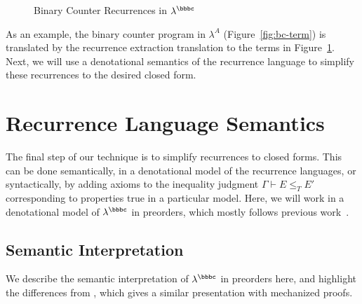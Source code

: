 \begin{figure}
  
  \vspace{-0.25in}
  \caption{Binary Counter Recurrences in $\lambda^\bbbc$}
  \label{fig:bc-rec}
\end{figure}

As an example, the binary counter program in $\lambda^A$
(Figure~\ref{fig:bc-term}) is translated by the recurrence extraction
translation to the terms in Figure~\ref{fig:bc-rec}.
Next, we will use a denotational semantics of the recurrence language to
simplify these recurrences to the desired closed form.

\section{Recurrence Language Semantics} \label{sec:preorder}

The final step of our technique is to simplify recurrences to closed
forms.  This can be done semantically, in a denotational model of the
recurrence languages, or syntactically, by adding axioms to the
inequality judgment $\Gamma \vdash E \le_T E'$ corresponding to
properties true in a particular model.  Here, we will work in a
denotational model of $\lambda^\bbbc$ in preorders, which mostly follows
previous work~\cite{danner-et-al:plpv13,danner-et-al:icfp15,hudson}.

\subsection{Semantic Interpretation}

We describe the semantic interpretation of $\lambda^\bbbc$ in preorders
here, and highlight the differences from \cite{hudson}, which gives a
similar presentation with mechanized proofs.


